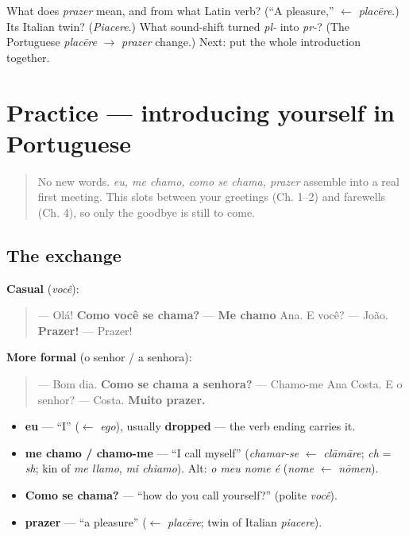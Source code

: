 \begin{tcolorbox}[breakable,colback=teal!4,colframe=teal!35!black,title={Before you move on}]
What does \emph{prazer} mean, and from what Latin verb? (\textquotedblleft{}A pleasure,\textquotedblright{} $\leftarrow$ \emph{placēre}.) Its Italian twin? (\emph{Piacere}.) What sound-shift turned \emph{pl-} into \emph{pr-}? (The Portuguese \emph{placēre} $\to$ \emph{prazer} change.) Next: put the whole introduction together.
\end{tcolorbox}
\section[Practice]{Practice — introducing yourself in Portuguese}

\label{lesson:PT-C03-practice}



\begin{quote}
No new words. \emph{eu, me chamo, como se chama, prazer} assemble into a real first meeting. This slots between your greetings (Ch. 1–2) and farewells (Ch. 4), so only the goodbye is still to come.
\end{quote}

\subsection*{The exchange}
\textbf{Casual} (\emph{você}):

\begin{quote}
— Olá! \textbf{Como você se chama?} — \textbf{Me chamo} Ana. E você? — João. \textbf{Prazer!} — Prazer!
\end{quote}

\textbf{More formal} (o senhor / a senhora):

\begin{quote}
— Bom dia. \textbf{Como se chama a senhora?} — Chamo-me Ana Costa. E o senhor? — Costa. \textbf{Muito prazer.}
\end{quote}

\begin{grammarlens}[title={What you've built this chapter}]
\begin{itemize}
\raggedright
  \item \textbf{eu} — \textquotedblleft{}I\textquotedblright{} ($\leftarrow$ \emph{ego}), usually \textbf{dropped} — the verb ending carries it.
  \item \textbf{me chamo / chamo-me} — \textquotedblleft{}I call myself\textquotedblright{} (\emph{chamar-se} $\leftarrow$ \emph{clāmāre}; \emph{ch} = \emph{sh}; kin of \emph{me llamo}, \emph{mi chiamo}). Alt: \emph{o meu nome é} (\emph{nome} $\leftarrow$ \emph{nōmen}).
  \item \textbf{Como se chama?} — \textquotedblleft{}how do you call yourself?\textquotedblright{} (polite \emph{você}).
  \item \textbf{prazer} — \textquotedblleft{}a pleasure\textquotedblright{} ($\leftarrow$ \emph{placēre}; twin of Italian \emph{piacere}).
\end{itemize}
\end{grammarlens}

